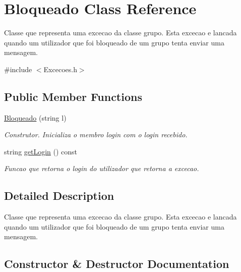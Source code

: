 \hypertarget{class_bloqueado}{}\section{Bloqueado Class Reference}
\label{class_bloqueado}


Classe que representa uma excecao da classe grupo. Esta excecao e lancada quando um utilizador que foi bloqueado de um grupo tenta enviar uma mensagem.  




{\ttfamily \#include $<$Excecoes.\+h$>$}

\subsection*{Public Member Functions}
\begin{DoxyCompactItemize}
\item 
\hyperlink{class_bloqueado_aeed14705a1258de654aa8017418f9da4}{Bloqueado} (string l)
\begin{DoxyCompactList}\small\item\em Construtor. Inicializa o membro login com o login recebido. \end{DoxyCompactList}\item 
\hypertarget{class_bloqueado_a4be9531006bc7b1ca77c9c9dbe5789a7}{}string \hyperlink{class_bloqueado_a4be9531006bc7b1ca77c9c9dbe5789a7}{get\+Login} () const \label{class_bloqueado_a4be9531006bc7b1ca77c9c9dbe5789a7}

\begin{DoxyCompactList}\small\item\em Funcao que retorna o login do utilizador que retorna a excecao. \end{DoxyCompactList}\end{DoxyCompactItemize}


\subsection{Detailed Description}
Classe que representa uma excecao da classe grupo. Esta excecao e lancada quando um utilizador que foi bloqueado de um grupo tenta enviar uma mensagem. 

\subsection{Constructor \& Destructor Documentation}
\hypertarget{class_bloqueado_aeed14705a1258de654aa8017418f9da4}{}

